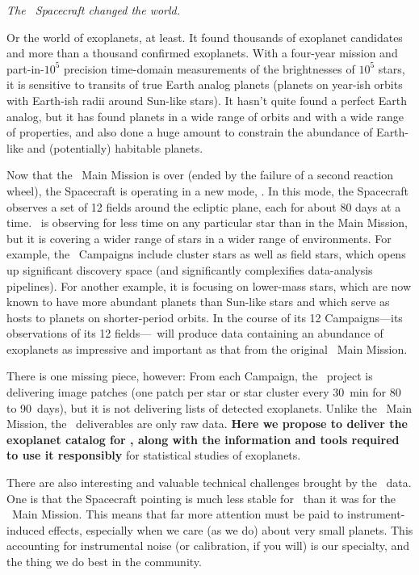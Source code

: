 \documentclass[12pt,preprint]{aastex}
\begin{document}
\emph{The \kepler\ Spacecraft changed the world.}

Or the world of exoplanets, at least.
It found thousands of exoplanet candidates and more than a thousand
confirmed exoplanets.
With a four-year mission and part-in-$10^5$ precision time-domain
measurements of the brightnesses of $10^5$ stars, it is sensitive to
transits of true Earth analog planets (planets on year-ish orbits with
Earth-ish radii around Sun-like stars).
It hasn't quite found a perfect Earth analog, but it has found planets
in a wide range of orbits and with a wide range of properties, and
also done a huge amount to constrain the abundance of Earth-like and
(potentially) habitable planets.

Now that the \kepler\ Main Mission is over (ended by the failure of a
second reaction wheel), the Spacecraft is operating in a new mode,
\kt.
In this mode, the Spacecraft observes a set of 12 fields around the
ecliptic plane, each for about 80 days at a time.
\kt\ is observing for less time on any particular star than in the
Main Mission, but it is covering a wider range of stars in a wider
range of environments.
For example, the \kt\ Campaigns include cluster stars as well as field
stars, which opens up significant discovery space (and significantly
complexifies data-analysis pipelines).
For another example, it is focusing on lower-mass stars, which are now
known to have more abundant planets than Sun-like stars and which
serve as hosts to planets on shorter-period orbits.
In the course of its 12 Campaigns---its observations of its 12
fields---\kt\ will produce data containing an abundance of exoplanets as
impressive and important as that from the original \kepler\ Main
Mission.

There is one missing piece, however:
From each Campaign, the \kt\ project is delivering image patches (one
patch per star or star cluster every 30~min for 80 to 90~days), but it
is not delivering lists of detected exoplanets.
Unlike the \kepler\ Main Mission, the \kt\ deliverables are only raw
data.
\textbf{Here we propose to deliver the exoplanet catalog for \kt,
along with the information and tools required to use it responsibly}
for statistical studies of exoplanets.

There are also interesting and valuable technical challenges brought
by the \kt\ data.
One is that the Spacecraft pointing is much less stable for \kt\ than
it was for the \kepler\ Main Mission.
This means that far more attention must be paid to instrument-induced
effects, especially when we care (as we do) about very small planets.
This accounting for instrumental noise (or calibration, if you will)
is our specialty, and the thing we do best in the community.
\end{document}
